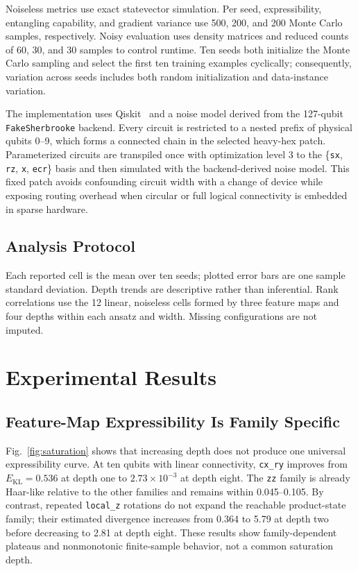\documentclass[conference]{IEEEtran}
\begin{document}
Noiseless metrics use exact statevector simulation.  Per seed,
expressibility, entangling capability, and gradient variance use 500, 200,
and 200 Monte Carlo samples, respectively.  Noisy evaluation uses density
matrices and reduced counts of 60, 30, and 30 samples to control runtime.
Ten seeds both initialize the Monte Carlo sampling and select the first ten
training examples cyclically; consequently, variation across seeds includes
both random initialization and data-instance variation.

The implementation uses Qiskit~\cite{javadiabhari2024qiskit} and a noise
model derived from the 127-qubit \texttt{FakeSherbrooke} backend.  Every
circuit is restricted to a nested prefix of physical qubits 0--9, which
forms a connected chain in the selected heavy-hex patch.  Parameterized
circuits are transpiled once with optimization level 3 to the
\{\texttt{sx}, \texttt{rz}, \texttt{x}, \texttt{ecr}\} basis and then
simulated with the backend-derived noise model.  This fixed patch avoids
confounding circuit width with a change of device while exposing routing
overhead when circular or full logical connectivity is embedded in sparse
hardware.

\subsection{Analysis Protocol}

Each reported cell is the mean over ten seeds; plotted error bars are one
sample standard deviation.  Depth trends are descriptive rather than
inferential.  Rank correlations use the 12 linear, noiseless cells formed by
three feature maps and four depths within each ansatz and width.  Missing
configurations are not imputed.

\section{Experimental Results}

\subsection{Feature-Map Expressibility Is Family Specific}

Fig.~\ref{fig:saturation} shows that increasing depth does not produce one
universal expressibility curve.  At ten qubits with linear connectivity,
\texttt{cx\_ry} improves from $E_{\mathrm{KL}}=0.536$ at depth one to
$2.73\times10^{-3}$ at depth eight.  The \texttt{zz} family is already
Haar-like relative to the other families and remains within 0.045--0.105.
By contrast, repeated \texttt{local\_z} rotations do not expand the reachable
product-state family; their estimated divergence increases from 0.364 to
5.79 at depth two before decreasing to 2.81 at depth eight.  These results
show family-dependent plateaus and nonmonotonic finite-sample behavior, not
a common saturation depth.
\end{document}
